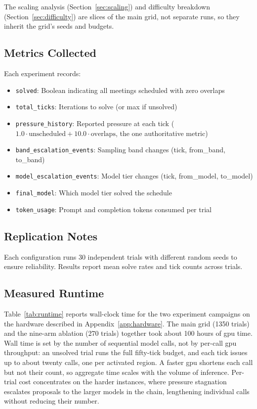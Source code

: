 The scaling analysis (Section~\ref{sec:scaling}) and difficulty breakdown (Section~\ref{sec:difficulty}) are slices of the main grid, not separate runs, so they inherit the grid's seeds and budgets.

\subsection{Metrics Collected}

Each experiment records:
\begin{itemize}
\item \texttt{solved}: Boolean indicating all meetings scheduled with zero overlaps
\item \texttt{total\_ticks}: Iterations to solve (or max if unsolved)
\item \texttt{pressure\_history}: Reported pressure at each tick ($1.0 \cdot \text{unscheduled} + 10.0 \cdot \text{overlaps}$, the one authoritative metric)
\item \texttt{band\_escalation\_events}: Sampling band changes (tick, from\_band, to\_band)
\item \texttt{model\_escalation\_events}: Model tier changes (tick, from\_model, to\_model)
\item \texttt{final\_model}: Which model tier solved the schedule
\item \texttt{token\_usage}: Prompt and completion tokens consumed per trial
\end{itemize}

\subsection{Replication Notes}

Each configuration runs 30 independent trials with different random seeds to ensure reliability. Results report mean solve rates and tick counts across trials.

\subsection{Measured Runtime}

Table~\ref{tab:runtime} reports wall-clock time for the two experiment campaigns on the hardware described in Appendix~\ref{app:hardware}. The main grid (1350 trials) and the nine-arm ablation (270 trials) together took about 100 hours of \acs{gpu} time. Wall time is set by the number of sequential model calls, not by per-call \acs{gpu} throughput: an unsolved trial runs the full fifty-tick budget, and each tick issues up to about twenty calls, one per activated region. A faster \acs{gpu} shortens each call but not their count, so aggregate time scales with the volume of inference. Per-trial cost concentrates on the harder instances, where pressure stagnation escalates proposals to the larger models in the chain, lengthening individual calls without reducing their number.

